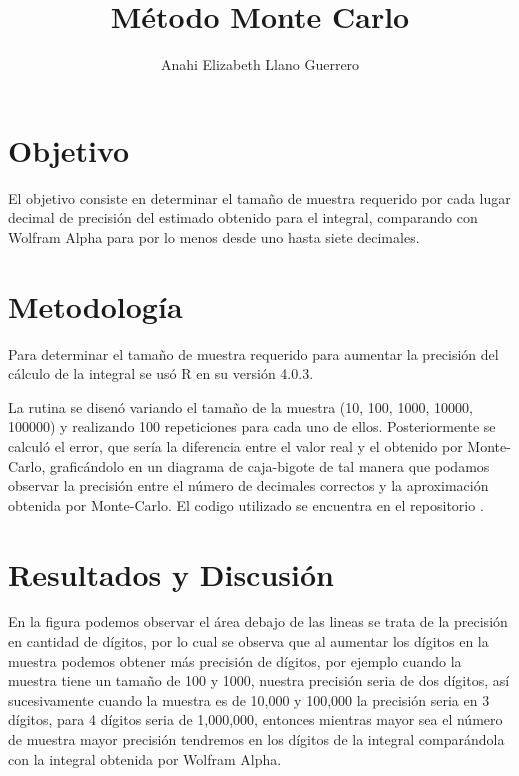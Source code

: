 \documentclass{article}
\begin{document}
\title{\textbf{M\'etodo Monte Carlo}}
\author{Anahi Elizabeth Llano Guerrero}

\maketitle

\section{Objetivo}\label{obj}

El objetivo \cite{elisa} consiste en determinar el tama\~no de muestra requerido por cada lugar decimal de precisi\'on del estimado obtenido para el integral, comparando con Wolfram Alpha para por lo menos desde uno hasta siete decimales.

\section{Metodolog\'{i}a}\label{met}

Para determinar el tama\~no de muestra requerido para aumentar la precisi\'on del c\'alculo de la integral se us\'o R en su versi\'on 4.0.3.


La rutina se disen\'o variando el tama\~no de la muestra (10, 100, 1000, 10000, 100000) y realizando 100 repeticiones para cada uno de ellos.  Posteriormente se calcul\'o el error, que ser\'ia la diferencia entre el valor real y el obtenido por Monte-Carlo, grafic\'andolo en un diagrama de caja-bigote de tal manera que podamos observar la precisi\'on entre el n\'umero de decimales correctos y la aproximaci\'on obtenida por Monte-Carlo. El codigo utilizado se encuentra en el repositorio \cite{ana}.

\section{Resultados y Discusi\'{o}n}\label{res}

En la figura podemos observar el \'area debajo de las lineas se trata de la precisi\'on en cantidad de d\'igitos, por lo cual se observa que al aumentar los d\'igitos en la muestra podemos obtener m\'as precisi\'on de d\'igitos, por ejemplo cuando la muestra tiene un tama\~no de 100 y 1000, nuestra precisi\'on seria de dos d\'igitos, as\'i sucesivamente cuando la muestra es de 10,000 y 100,000 la precisi\'on seria en 3 d\'igitos, para 4 d\'igitos seria de 1,000,000, entonces mientras mayor sea el n\'umero de muestra mayor precisi\'on tendremos en los d\'igitos de la integral compar\'andola con la integral obtenida por Wolfram Alpha.
\end{document}
